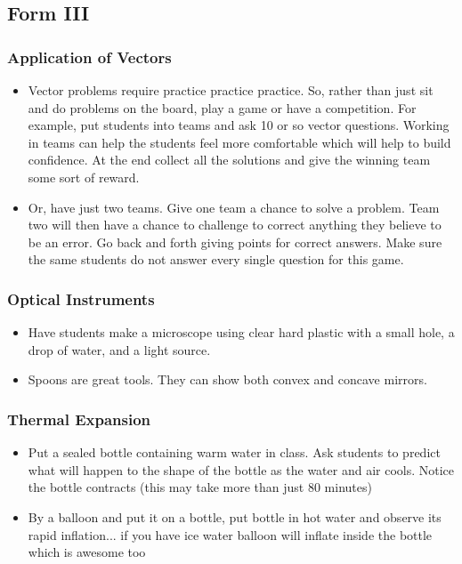 \subsection{Form III}
 \subsubsection{Application of Vectors}
\begin{itemize}
\item	Vector problems require practice practice practice. So, rather than just sit and do problems on the board, play a game or have a competition. For example, put students into teams and ask 10 or so vector questions. Working in teams can help the students feel more comfortable which will help to build confidence. At the end collect all the solutions and give the winning team some sort of reward. 
\item	Or, have just two teams. Give one team a chance to solve a problem. Team two will then have a chance to challenge to correct anything they believe to be an error. Go back and forth giving points for correct answers. Make sure the same students do not answer every single question for this game.
\end{itemize}


 \subsubsection{Optical Instruments}
\begin{itemize}
\item	Have students make a microscope using  clear hard plastic with a small hole, a drop of water, and a light source.
\item	Spoons are great tools. They can show both convex and concave mirrors. 
\end{itemize}

 \subsubsection{Thermal Expansion}
\begin{itemize}
\item	Put a sealed bottle containing warm water in class. Ask students to predict what will happen to the shape of the bottle as the water and air cools. Notice the bottle contracts (this may take more than just 80 minutes)
\item	By a balloon and put it on a bottle, put bottle in hot water and observe its rapid inflation... if you have ice water balloon will inflate inside the bottle which is awesome too
\end{itemize}

